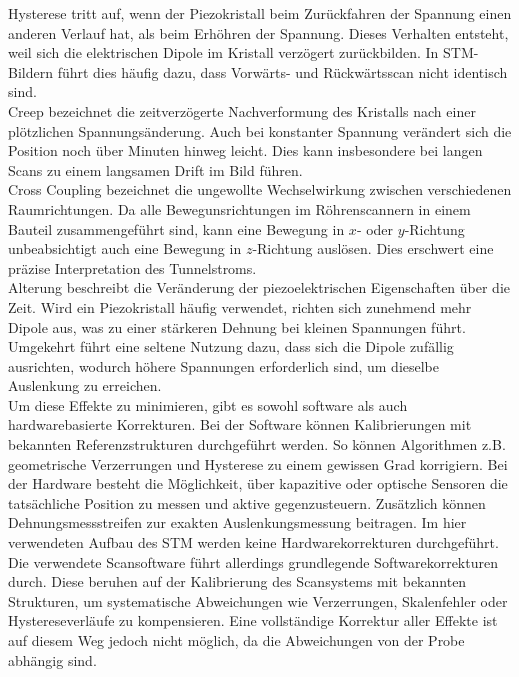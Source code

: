 Hysterese tritt auf, wenn der Piezokristall beim Zurückfahren der Spannung einen anderen Verlauf hat, als beim Erhöhren der Spannung.
Dieses Verhalten entsteht, weil sich die elektrischen Dipole im Kristall verzögert zurückbilden. In STM-Bildern führt dies häufig dazu, dass Vorwärts- und Rückwärtsscan nicht identisch sind.\\

Creep bezeichnet die zeitverzögerte Nachverformung des Kristalls nach einer plötzlichen Spannungsänderung. Auch bei konstanter Spannung verändert sich die Position noch über Minuten hinweg leicht. 
Dies kann insbesondere bei langen Scans zu einem langsamen Drift im Bild führen.\\

Cross Coupling bezeichnet die ungewollte Wechselwirkung zwischen verschiedenen Raumrichtungen. 
Da alle Bewegunsrichtungen im Röhrenscannern in einem Bauteil zusammengeführt sind, kann eine Bewegung in $x$- oder $y$-Richtung unbeabsichtigt auch eine Bewegung in $z$-Richtung auslösen. 
Dies erschwert eine präzise Interpretation des Tunnelstroms.\\

Alterung beschreibt die Veränderung der piezoelektrischen Eigenschaften über die Zeit. Wird ein Piezokristall häufig verwendet, richten sich zunehmend mehr Dipole aus, was zu einer stärkeren Dehnung bei kleinen Spannungen führt. Umgekehrt führt eine seltene Nutzung dazu, dass sich die Dipole zufällig ausrichten, wodurch höhere Spannungen erforderlich sind, um dieselbe Auslenkung zu erreichen.\\

Um diese Effekte zu minimieren, gibt es sowohl software als auch hardwarebasierte Korrekturen.
Bei der Software können Kalibrierungen mit bekannten Referenzstrukturen durchgeführt werden.
So können Algorithmen z.B. geometrische Verzerrungen und Hysterese zu einem gewissen Grad korrigiern.
Bei der Hardware besteht die Möglichkeit, über kapazitive oder optische Sensoren die tatsächliche Position zu messen und aktive gegenzusteuern.
Zusätzlich können Dehnungsmessstreifen zur exakten Auslenkungsmessung beitragen. 
Im hier verwendeten Aufbau des STM werden keine Hardwarekorrekturen durchgeführt. 
Die verwendete Scansoftware führt allerdings grundlegende Softwarekorrekturen durch. 
Diese  beruhen auf der Kalibrierung des Scansystems mit bekannten Strukturen, um systematische Abweichungen wie Verzerrungen, Skalenfehler oder Hystereseverläufe zu kompensieren. 
Eine vollständige Korrektur aller Effekte ist auf diesem Weg jedoch nicht möglich, da die Abweichungen von der Probe abhängig sind.

